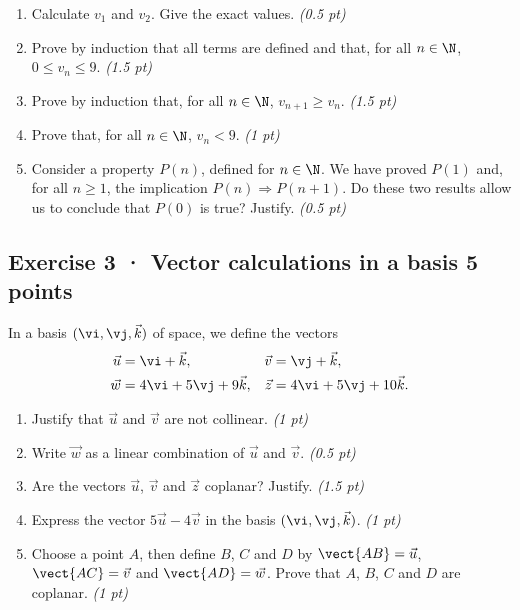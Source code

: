 \begin{enumerate}

\item Calculate $v_1$ and $v_2$. Give the exact values. \hfill\textit{(0.5 pt)}

\item Prove by induction that all terms are defined and that, for all $n\in\N$, $0\le v_n\le9$. \hfill\textit{(1.5 pt)}

\item Prove by induction that, for all $n\in\N$, $v_{n+1}\ge v_n$. \hfill\textit{(1.5 pt)}

\item Prove that, for all $n\in\N$, $v_n<9$. \hfill\textit{(1 pt)}

\item Consider a property $P(n)$, defined for $n\in\N$. We have proved $P(1)$ and, for all $n\ge1$, the implication $P(n)\Rightarrow P(n+1)$. Do these two results allow us to conclude that $P(0)$ is true? Justify. \hfill\textit{(0.5 pt)}

\end{enumerate}

\mxnewpage{}

\subsection*{Exercise 3 · Vector calculations in a basis \hfill 5 points}In a basis $(\vi,\vj,\vec k)$ of space, we define the vectors
\[\begin{aligned}\vec u&=\vi+\vec k,&\vec v&=\vj+\vec k,\\
\vec w&=4\vi+5\vj+9\vec k,&\vec z&=4\vi+5\vj+10\vec k.\end{aligned}\]

\begin{enumerate}

\item Justify that $\vec u$ and $\vec v$ are not collinear. \hfill\textit{(1 pt)}

\item Write $\vec w$ as a linear combination of $\vec u$ and $\vec v$. \hfill\textit{(0.5 pt)}

\item Are the vectors $\vec u$, $\vec v$ and $\vec z$ coplanar? Justify. \hfill\textit{(1.5 pt)}

\item Express the vector $5\vec u-4\vec v$ in the basis $(\vi,\vj,\vec k)$. \hfill\textit{(1 pt)}

\item Choose a point $A$, then define $B$, $C$ and $D$ by $\vect{AB}=\vec u$, $\vect{AC}=\vec v$ and $\vect{AD}=\vec w$. Prove that $A$, $B$, $C$ and $D$ are coplanar. \hfill\textit{(1 pt)}

\end{enumerate}

